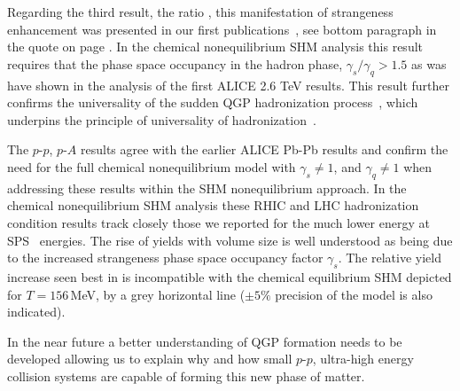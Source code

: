 Regarding the third result, the ratio , this manifestation of strangeness enhancement was presented in our first publications~\cite{Rafelski:1980rk,Rafelski:1980fy}, see bottom paragraph in the quote on page \pageref{FirstPredict}. In the chemical nonequilibrium SHM analysis this result requires that the phase space occupancy in the hadron phase, $\gamma_s/\gamma_q>1.5$ as was have shown in the analysis of the first ALICE 2.6 TeV results\cite{Petran:2013qla,Petran:2013lja}. This result further confirms the universality of the sudden QGP hadronization process~\cite{Rafelski:2000by}, which underpins the principle of universality of hadronization~\cite{Petran:2013qla,Rafelski:2014cqa}. \label{RLam}

The $p$-$p$, $p$-$A$ results agree with the earlier ALICE Pb-Pb results and confirm the need for the full chemical nonequilibrium model with $\gamma_s\ne 1$, and $\gamma_q\ne 1$ when addressing these results within the SHM nonequilibrium approach. In the chemical nonequilibrium SHM analysis these RHIC and LHC hadronization condition results track closely those we reported for the much lower energy at SPS~\cite{Letessier:2005qe} energies. The rise of yields with volume size is well understood as being due to the increased strangeness phase space occupancy factor $\gamma_s$. The relative yield increase seen best in  is incompatible with the chemical equilibrium SHM depicted for $T=156$\,MeV, by a grey horizontal line ($\pm5\% $ precision of the model is also indicated).

In the near future a better understanding of QGP formation needs to be developed allowing us to explain why and how small $p$-$p$, ultra-high energy collision systems are capable of forming this new phase of matter. 

%
